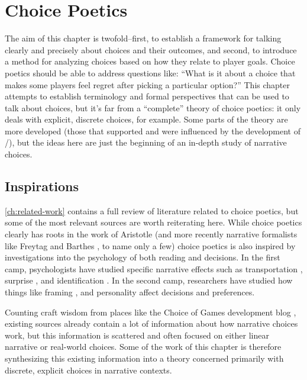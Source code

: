 \chapter{Choice Poetics}

\label{ch:choice-poetics}

The aim of this chapter is twofold--first, to establish a framework for talking clearly and precisely about choices and their outcomes, and second, to introduce a method for analyzing choices based on how they relate to player goals.
%
Choice poetics should be able to address questions like: ``What is it about a choice that makes some players feel regret after picking a particular option?''
%
This chapter attempts to establish terminology and formal perspectives that can be used to talk about choices, but it's far from a ``complete'' theory of choice poetics: it only deals with explicit, discrete choices, for example.
%
Some parts of the theory are more developed (those that supported and were influenced by the development of \dunyazad/), but the ideas here are just the beginning of an in-depth study of narrative choices.


\section{Inspirations}

\cref{ch:related-work} contains a full review of literature related to choice poetics, but some of the most relevant sources are worth reiterating here.
%
While choice poetics clearly has roots in the work of Aristotle \citep{Aristotle1917} (and more recently narrative formalists like Freytag \citep{Freytag1894} and Barthes \citep{Barthes1975}, to name only a few) choice poetics is also inspired by investigations into the psychology of both reading and decisions.
%
In the first camp, psychologists have studied specific narrative effects such as transportation \citep{Green2000}, surprise \citep{Iran-Nejad1987}, and identification \citep{Oatley1995}.
%
In the second camp, researchers have studied how things like framing \citep{Tversky1981,Tversky1993}, and personality affect decisions and preferences.


Counting craft wisdom from places like the Choice of Games development blog \citep{ChoiceOfGamesGameDesignCategory}, existing sources already contain a lot of information about how narrative choices work, but this information is scattered and often focused on either linear narrative or real-world choices.
%
Some of the work of this chapter is therefore synthesizing this existing information into a theory concerned primarily with discrete, explicit choices in narrative contexts.


